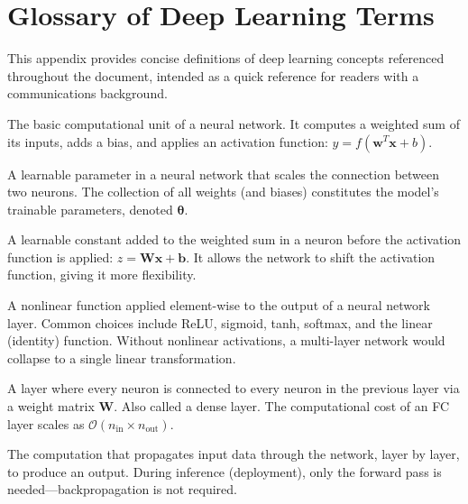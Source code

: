 \chapter{Glossary of Deep Learning Terms}
\label{app:dl_glossary}

This appendix provides concise definitions of deep learning concepts
referenced throughout the document, intended as a quick reference for
readers with a communications background.

\begin{description}[style=nextline, font=\normalfont\bfseries, leftmargin=1.5em]

    \item[Neuron]
    The basic computational unit of a neural network.  It computes
    a weighted sum of its inputs, adds a bias, and applies an
    activation function: $y = f(\bm{w}^T \bm{x} + b)$.

    \item[Weight]
    A learnable parameter in a neural network that scales the
    connection between two neurons.  The collection of all weights
    (and biases) constitutes the model's trainable parameters,
    denoted $\bm{\theta}$.

    \item[Bias]
    A learnable constant added to the weighted sum in a neuron before
    the activation function is applied: $z = \bm{W}\bm{x} + \bm{b}$.
    It allows the network to shift the activation function, giving
    it more flexibility.

    \item[Activation Function]
    A nonlinear function applied element-wise to the output of a
    neural network layer.  Common choices include ReLU, sigmoid, tanh,
    softmax, and the linear (identity) function.  Without nonlinear
    activations, a multi-layer network would collapse to a single
    linear transformation.

    \item[Fully Connected (FC) Layer]
    A layer where every neuron is connected to every neuron in the
    previous layer via a weight matrix $\bm{W}$.  Also called a
    dense layer.  The computational cost of an FC layer scales as
    $\mathcal{O}(n_{\mathrm{in}} \times n_{\mathrm{out}})$.

    \item[Forward Pass]
    The computation that propagates input data through the network,
    layer by layer, to produce an output.  During inference (deployment),
    only the forward pass is needed---backpropagation is not required.


\end{description}
